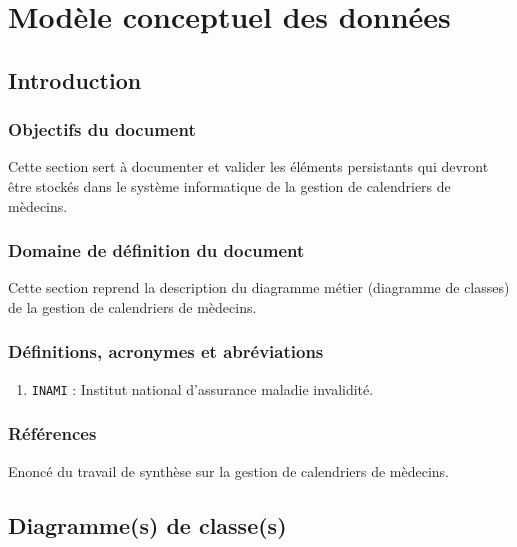 \documentclass[a4paper, 11pt]{report}
\begin{document}

\tableofcontents

\chapter{Modèle conceptuel des données}

\section{Introduction}

\subsection{Objectifs du document}

Cette section sert à documenter et valider les éléments persistants qui devront
être stockés dans le système informatique de la gestion de calendriers de mèdecins.

\subsection{Domaine de définition du document}

Cette section reprend la description du diagramme métier (diagramme de classes) de la gestion de 
calendriers de mèdecins.

\subsection{Définitions, acronymes et abréviations}

\begin{enumerate}

\item \texttt{INAMI} : Institut national d'assurance maladie invalidité.

\end{enumerate}

\subsection{Références}

Enoncé du travail de synthèse sur la gestion de calendriers de mèdecins.

\newpage
\section{Diagramme(s) de classe(s)}
\end{document}
